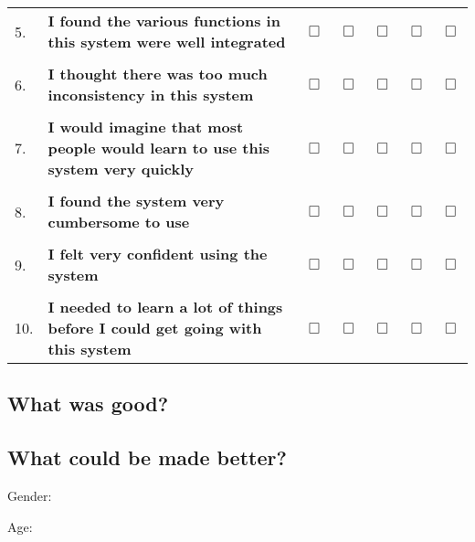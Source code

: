 \documentclass[a4paper,10pt]{article}
\def\MBox{\Large\ensuremath{\Box}}
\begin{document}
\begin{center}
\begin{tabu}{l X S S S S S}
5.  &\textbf{I found the various functions in this system were well integrated}\dotfill                         & \MBox                                          & \MBox & \MBox & \MBox & \MBox\\
    &                                                                                                           &                                                &       &       &       & \\
6.  &\textbf{I thought there was too much inconsistency in this system}\dotfill                                 & \MBox                                          & \MBox & \MBox & \MBox & \MBox\\
    &                                                                                                           &                                                &       &       &       & \\
7.  &\textbf{I would imagine that most people would learn to use this system very quickly}\dotfill              & \MBox                                          & \MBox & \MBox & \MBox & \MBox\\
    &                                                                                                           &                                                &       &       &       & \\
8.  &\textbf{I found the system very cumbersome to use}\dotfill                                                 & \MBox                                          & \MBox & \MBox & \MBox & \MBox\\
    &                                                                                                           &                                                &       &       &       & \\
9.  &\textbf{I felt very confident using the system}\dotfill                                                    & \MBox                                          & \MBox & \MBox & \MBox & \MBox\\
    &                                                                                                           &                                                &       &       &       & \\
10. &\textbf{I needed to learn a lot of things before I could get going with this system}\dotfill               & \MBox                                          & \MBox & \MBox & \MBox & \MBox\\
\end{tabu}%
\end{center}

\bigskip
\subsection*{What was good?}
\vfill
\subsection*{What could be made better?}
\vfill
\vfill
Gender:

Age:
\end{document}

